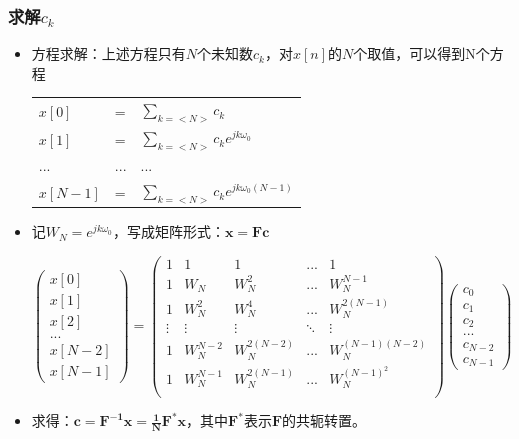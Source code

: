 \documentclass[CJKutf8,xcolor=pdftex,dvipsnames,table]{beamer}
\begin{document}
\begin{CJK*}{UTF8}{song}
  \begin{frame}
    \frametitle{求解$c_k$}
    \begin{itemize}
    \item 方程求解：上述方程只有$N$个未知数$c_k$，对$x[n]$的$N$个取值，可以得到N个方程
    \begin{center}
    \begin{tabular}{lll}
    $x[0]$ & = & $\sum_{k=<N>} c_k$    \\
    $x[1]$ & = & $\sum_{k=<N>} c_k e^{jk \omega_0}$ \\
    ...    & ... & ... \\
    $x[N-1]$ & = & $\sum_{k=<N>} c_k e^{jk \omega_0 (N-1)} $ \\
    \end{tabular} 
    \end{center}
    \item 记$W_N=e^{jk\omega_0}$，写成矩阵形式：$\mathbf{x = Fc}$
    \begin{center}
    \[
    \begin{pmatrix}
x[0]  \\
x[1]  \\
x[2]  \\
...   \\
x[N-2] \\
x[N-1]
	\end{pmatrix}    
	=
    \begin{pmatrix}
1      & 1   & 1     & ... & 1 \\
1      & W_N & W_N^2 & ... & W_N^{N-1} \\
1      & W_N^2 & W_N^4 & ... & W_N^{2(N-1)} \\
\vdots & \vdots & \vdots  & \ddots & \vdots \\
1      & W_N^{N-2} & W_N^{2(N-2)} & ... & W_N^{(N-1)(N-2)} \\
1      & W_N^{N-1} & W_N^{2(N-1)} & ... & W_N^{(N-1)^2} \\

	\end{pmatrix}
    \begin{pmatrix}
c_0  \\
c_1  \\
c_2  \\
...   \\
c_{N-2} \\
c_{N-1}
	\end{pmatrix} 	
	\]    
    \end{center} 
 
    \item 求得：$\mathbf{c = F^{-1}x=\frac{1}{N}F^*x}$，其中$\mathbf{F^*}$表示$\mathbf{F}$的共轭转置。



\end{itemize}
\end{frame}
\end{CJK*}
\end{document}
